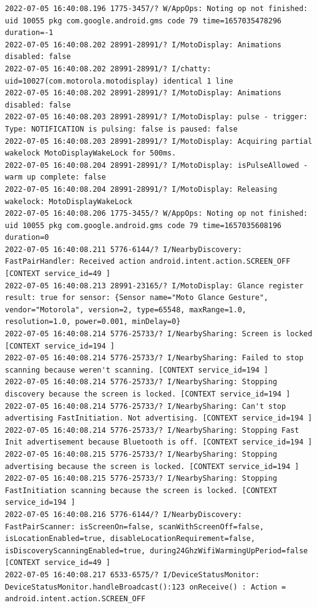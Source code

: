 \documentclass[a4paper,12pt]{book}
\begin{document}
\begin{lstlisting}
2022-07-05 16:40:08.196 1775-3457/? W/AppOps: Noting op not finished: uid 10055 pkg com.google.android.gms code 79 time=1657035478296 duration=-1
2022-07-05 16:40:08.202 28991-28991/? I/MotoDisplay: Animations disabled: false
2022-07-05 16:40:08.202 28991-28991/? I/chatty: uid=10027(com.motorola.motodisplay) identical 1 line
2022-07-05 16:40:08.202 28991-28991/? I/MotoDisplay: Animations disabled: false
2022-07-05 16:40:08.203 28991-28991/? I/MotoDisplay: pulse - trigger: Type: NOTIFICATION is pulsing: false is paused: false
2022-07-05 16:40:08.203 28991-28991/? I/MotoDisplay: Acquiring partial wakelock MotoDisplayWakeLock for 500ms.
2022-07-05 16:40:08.204 28991-28991/? I/MotoDisplay: isPulseAllowed - warm up complete: false
2022-07-05 16:40:08.204 28991-28991/? I/MotoDisplay: Releasing wakelock: MotoDisplayWakeLock
2022-07-05 16:40:08.206 1775-3455/? W/AppOps: Noting op not finished: uid 10055 pkg com.google.android.gms code 79 time=1657035608196 duration=0
2022-07-05 16:40:08.211 5776-6144/? I/NearbyDiscovery: FastPairHandler: Received action android.intent.action.SCREEN_OFF [CONTEXT service_id=49 ]
2022-07-05 16:40:08.213 28991-23165/? I/MotoDisplay: Glance register result: true for sensor: {Sensor name="Moto Glance Gesture", vendor="Motorola", version=2, type=65548, maxRange=1.0, resolution=1.0, power=0.001, minDelay=0}
2022-07-05 16:40:08.214 5776-25733/? I/NearbySharing: Screen is locked [CONTEXT service_id=194 ]
2022-07-05 16:40:08.214 5776-25733/? I/NearbySharing: Failed to stop scanning because weren't scanning. [CONTEXT service_id=194 ]
2022-07-05 16:40:08.214 5776-25733/? I/NearbySharing: Stopping discovery because the screen is locked. [CONTEXT service_id=194 ]
2022-07-05 16:40:08.214 5776-25733/? I/NearbySharing: Can't stop advertising FastInitiation. Not advertising. [CONTEXT service_id=194 ]
2022-07-05 16:40:08.214 5776-25733/? I/NearbySharing: Stopping Fast Init advertisement because Bluetooth is off. [CONTEXT service_id=194 ]
2022-07-05 16:40:08.215 5776-25733/? I/NearbySharing: Stopping advertising because the screen is locked. [CONTEXT service_id=194 ]
2022-07-05 16:40:08.215 5776-25733/? I/NearbySharing: Stopping FastInitiation scanning because the screen is locked. [CONTEXT service_id=194 ]
2022-07-05 16:40:08.216 5776-6144/? I/NearbyDiscovery: FastPairScanner: isScreenOn=false, scanWithScreenOff=false, isLocationEnabled=true, disableLocationRequirement=false, isDiscoveryScanningEnabled=true, during24GhzWifiWarmingUpPeriod=false [CONTEXT service_id=49 ]
2022-07-05 16:40:08.217 6533-6575/? I/DeviceStatusMonitor: DeviceStatusMonitor.handleBroadcast():123 onReceive() : Action = android.intent.action.SCREEN_OFF

\end{lstlisting}
\end{document}
